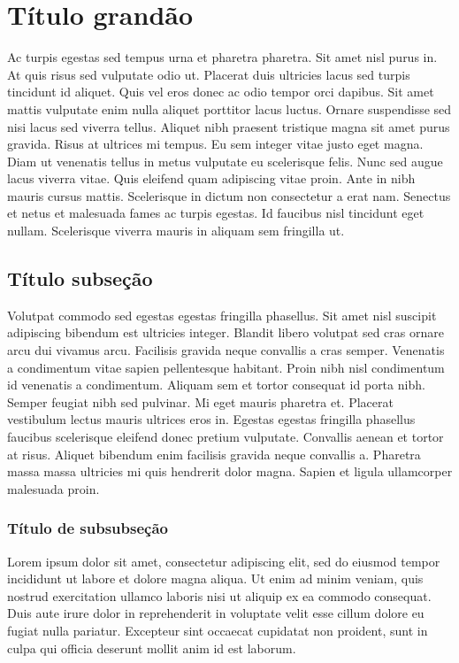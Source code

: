 \documentclass[12pt]{article}
\begin{document}
	\section{Título grand\~ao}
		Ac turpis egestas sed tempus urna et pharetra pharetra. Sit amet nisl purus in. At quis risus sed vulputate odio ut. Placerat duis ultricies lacus sed turpis tincidunt id aliquet. Quis vel eros donec ac odio tempor orci dapibus. Sit amet mattis vulputate enim nulla aliquet porttitor lacus luctus. Ornare suspendisse sed nisi lacus sed viverra tellus. Aliquet nibh praesent tristique magna sit amet purus gravida. Risus at ultrices mi tempus. Eu sem integer vitae justo eget magna. Diam ut venenatis tellus in metus vulputate eu scelerisque felis. Nunc sed augue lacus viverra vitae. Quis eleifend quam adipiscing vitae proin. Ante in nibh mauris cursus mattis. Scelerisque in dictum non consectetur a erat nam. Senectus et netus et malesuada fames ac turpis egestas. Id faucibus nisl tincidunt eget nullam. Scelerisque viverra mauris in aliquam sem fringilla ut.
	\subsection{Título subseção}
		Volutpat commodo sed egestas egestas fringilla phasellus. Sit amet nisl suscipit adipiscing bibendum est ultricies integer. Blandit libero volutpat sed cras ornare arcu dui vivamus arcu. Facilisis gravida neque convallis a cras semper. Venenatis a condimentum vitae sapien pellentesque habitant. Proin nibh nisl condimentum id venenatis a condimentum. Aliquam sem et tortor consequat id porta nibh. Semper feugiat nibh sed pulvinar. Mi eget mauris pharetra et. Placerat vestibulum lectus mauris ultrices eros in. Egestas egestas fringilla phasellus faucibus scelerisque eleifend donec pretium vulputate. Convallis aenean et tortor at risus. Aliquet bibendum enim facilisis gravida neque convallis a. Pharetra massa massa ultricies mi quis hendrerit dolor magna. Sapien et ligula ullamcorper malesuada proin.
	\subsubsection{Título de subsubseção}
		Lorem ipsum dolor sit amet, consectetur adipiscing elit, sed do eiusmod tempor incididunt ut labore et dolore magna aliqua. Ut enim ad minim veniam, quis nostrud exercitation ullamco laboris nisi ut aliquip ex ea commodo consequat. Duis aute irure dolor in reprehenderit in voluptate velit esse cillum dolore eu fugiat nulla pariatur. Excepteur sint occaecat cupidatat non proident, sunt in culpa qui officia deserunt mollit anim id est laborum.
		
\end{document}
